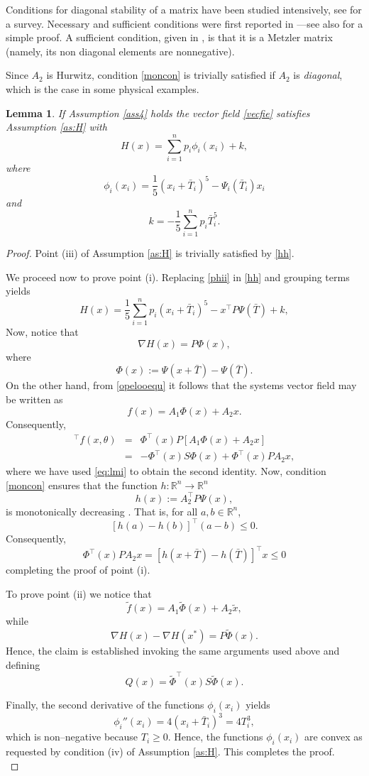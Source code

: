\documentclass[10pt, conference]{ieeeconf}
\newtheorem{lemma}{Lemma}
\def\rea{\mathbb{R}}
\def\begequarrs{\begin{eqnarray*}}
\def\endequarrs{\end{eqnarray*}}
\def\begequ{\begin{equation}}
\def\endequ{\end{equation}}
\def\lab{\label}
\begin{document}
Conditions for diagonal stability of a matrix have been studied intensively, see \cite{KASBHA} for a survey. Necessary and sufficient conditions were first reported in \cite{BARetal}---see also \cite{SHOetal} for a simple proof. A sufficient condition, given  in \cite{Farina},  is that it is a Metzler matrix (namely, its non diagonal elements are nonnegative).  

Since $A_2$ is Hurwitz, condition \eqref{moncon} is trivially satisfied if $A_2$ is {\em diagonal}, which is the case in some physical examples.

\begin{lemma} \label{lem3}
If Assumption \ref{ass4} holds  the vector field \eqref{vecfie} satisfies Assumption \ref{as:H} with
\begequ
\lab{hh}
H(x)=\sum_{i=1}^n p_i \phi_i(x_i)+k,
\endequ
where
\begequ
\lab{phii}
\phi_i(x_i)=\frac{1}{5}(x_i+\bar T_i)^5  - \Psi_i(\bar T_i) x_i
\endequ
and
$$
k= -\frac{1}{5}\sum_{i=1}^{n}p_i \bar T_i^5.
$$
\end{lemma}
\begin{proof}
Point (iii) of  Assumption \ref{as:H} is trivially satisfied by \eqref{hh}.

We proceed now to prove point (i). Replacing \eqref{phii} in \eqref{hh} and grouping terms yields
$$
H(x) = \frac{1}{5}\sum_{i=1}^{n}p_i (x_i+\bar T_i)^5 - x^\top P \Psi(\bar T)+k,
$$
Now, notice that
$$
\nabla H(x)=P \Phi(x),
$$
where
\begequ
\lab{phi}
\Phi(x):=\Psi(x+\bar T)-\Psi(\bar T).
\endequ
On the other hand, from \eqref{opelooequ} it follows that the systems vector field may be written as
$$
 f(x)  =   A_1 \Phi(x)+A_2 x.
$$
Consequently,
\begequarrs
[\nabla H(x)]^\top f(x,\theta) & = & \Phi^\top(x)P[ A_1 \Phi(x)+A_2 x ]\\
& = &  -\Phi^\top(x) S  \Phi(x)+ \Phi^\top(x) P A_2 x,
\endequarrs
where we have used \eqref{eq:lmi} to obtain the second identity. Now, condition \eqref{moncon} ensures that the function $h:\rea^n \to \rea^n$
$$
h(x):= A_2^\top P\Psi(x), 
$$
is monotonically decreasing \cite{PAVetal}. That is, for all $a,b \in \rea^n$,
$$
[h(a)-h(b)]^\top (a-b) \leq 0.
$$
Consequently,
$$
\Phi^\top(x) P A_2 x=[h(x+\bar T)-h(\bar T)]^\top x \leq 0 
$$
completing the proof of point (i).

To prove point (ii) we notice that
$$
\tilde f(x)=A_1 \tilde \Phi(x) + A_2 \tilde x,
$$
while
$$
\nabla H(x) - \nabla H(x^*)=P \tilde \Phi(x).
$$
Hence, the claim is established invoking the same arguments used above and defining
$$
Q(x)=\tilde \Phi^\top(x) S \tilde \Phi(x).
$$

Finally, the second derivative of the functions $\phi_i(x_i)$ yields
$$
\phi_i''(x_i)=4 (x_i + \bar T_i)^3=4 T_i^3,
$$
which is non--negative because $T_i \geq 0$. Hence, the functions $\phi_i(x_i)$ are convex as requested by condition (iv) of Assumption \ref{as:H}. This completes the proof.\\
\end{proof}
\end{document}

